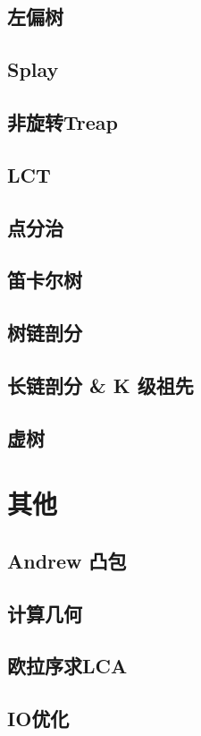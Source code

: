 \documentclass[a4paper,12pt]{article}
\begin{document}
\subsection{左偏树}

\subsection{Splay}

\subsection{非旋转Treap}

\subsection{LCT}

\subsection{点分治}

\subsection{笛卡尔树}

\subsection{树链剖分}

\subsection{长链剖分 \& K 级祖先}

\subsection{虚树}


\section{其他}

\subsection{Andrew 凸包}

\subsection{计算几何}

\subsection{欧拉序求LCA}

\subsection{IO优化}



\label{LastPage}
\end{document}
